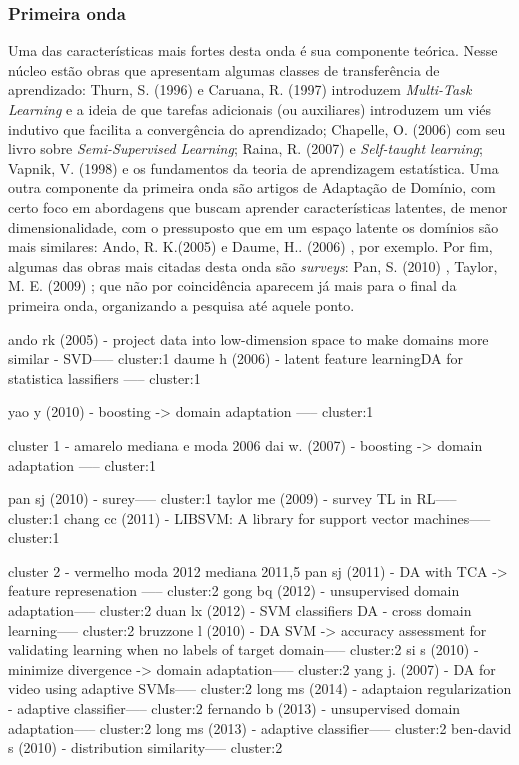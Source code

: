 \documentclass[sigconf]{acmart}
\begin{document}
\subsubsection{Primeira onda}
Uma das características mais fortes desta onda é sua componente teórica. Nesse núcleo estão obras que apresentam algumas classes de transferência de aprendizado: Thurn, S. (1996) \cite{thrun1996learning} e Caruana, R. (1997) \cite{Caruana1997} introduzem \emph{Multi-Task Learning} e a ideia de que tarefas adicionais (ou auxiliares) introduzem um viés indutivo que facilita a convergência do aprendizado; Chapelle, O. (2006) \cite{Chapelle:2010:SL:1841234} com seu livro sobre \emph{Semi-Supervised Learning}; Raina, R. (2007) e \emph{Self-taught learning}; Vapnik, V. (1998) \cite{Vapnik1998} e os fundamentos da teoria de aprendizagem estatística.
Uma outra componente da primeira onda são artigos de Adaptação de Domínio, com certo foco em abordagens que buscam aprender características latentes, de menor dimensionalidade, com o pressuposto que em um espaço latente os domínios são mais similares: Ando, R. K.(2005) \cite{ando2005framework} e Daume, H.. (2006) \cite{DaumeIII2006}, por exemplo. 
Por fim, algumas das obras mais citadas desta onda são \emph{surveys}: Pan, S. (2010) \cite{PanYang}, Taylor, M. E. (2009) \cite{Taylor:2009:TLR:1577069.1755839}; que não por coincidência aparecem já mais para o final da primeira onda, organizando a pesquisa até aquele ponto. 


ando rk (2005) - project data into low-dimension space to make domains more similar - SVD----- cluster:1
daume h (2006) - latent feature learningDA for statistica lassifiers ----- cluster:1



yao y (2010) - boosting -> domain adaptation ----- cluster:1


  cluster 1 - amarelo
  mediana e moda 2006
  dai w. (2007) - boosting -> domain adaptation ----- cluster:1

  pan sj (2010) - surey----- cluster:1
  taylor me (2009) - survey TL in RL----- cluster:1
chang cc (2011) - LIBSVM: A library for support vector machines----- cluster:1

  cluster 2 - vermelho
  moda 2012
  mediana 2011,5
  pan sj (2011) - DA with TCA -> feature represenation ----- cluster:2
gong bq (2012) - unsupervised domain adaptation----- cluster:2
duan lx (2012) - SVM classifiers DA - cross domain learning----- cluster:2
bruzzone l (2010) - DA SVM -> accuracy assessment for validating learning when no labels of target domain----- cluster:2
si s (2010) - minimize divergence -> domain adaptation----- cluster:2
yang j. (2007) - DA for video using adaptive SVMs----- cluster:2
long ms (2014) - adaptaion regularization - adaptive classifier----- cluster:2
fernando b (2013) - unsupervised domain adaptation----- cluster:2
long ms (2013) - adaptive classifier----- cluster:2
ben-david s (2010) - distribution similarity----- cluster:2
\end{document}
